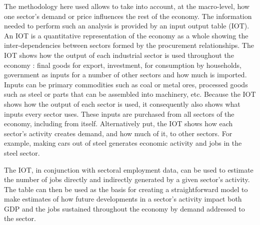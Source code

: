 \documentclass[12pt,english]{article}
\begin{document}
The methodology here used allows to take into account, at the macro-level, how one sector's demand or price influences the rest of the economy. The information needed to perform such an analysis %
is provided by an input output table (IOT). %
An IOT is a quantitative representation of the economy as a whole showing the inter-dependencies between sectors formed by the procurement relationships. %
The IOT shows how the output of each industrial sector is used throughout the economy : final goods for export, investment, for consumption by households, government as inputs for a number of other sectors and how much is imported. Inputs can be primary commodities such as coal or metal ores, processed goods such as steel or parts that can be assembled into machinery, etc. Because the IOT shows how the output of each sector is used, it consequently also shows what inputs every sector uses. These inputs are purchased from all sectors of the economy, including from itself. Alternatively put, the IOT shows how each sector's activity creates demand, and how much of it, to other sectors. For example, making cars out of steel generates economic activity and jobs in the steel sector. 

The IOT, in conjunction with sectoral employment data, can be used to estimate the number of jobs directly and indirectly generated by a given sector's activity. The table can then be used as the basis for creating a straightforward model to make estimates of how future developments in a sector's activity impact both GDP and the jobs sustained throughout the economy by demand addressed to the sector.

\end{document}
